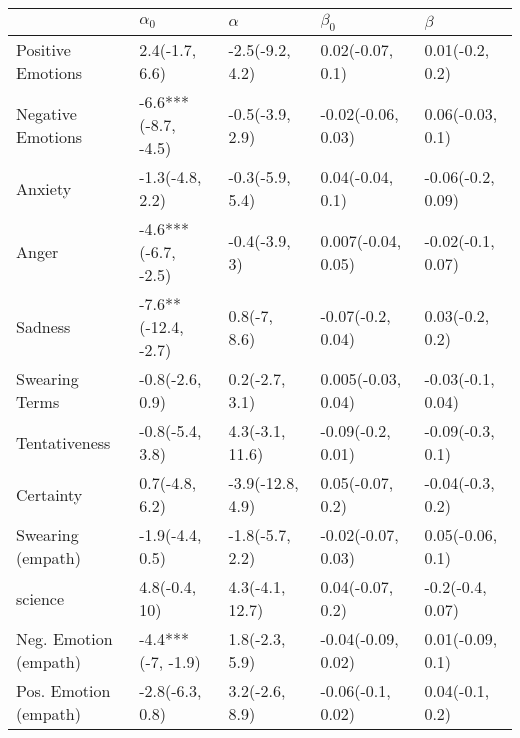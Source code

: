 \begin{tabular}{lllll}
\toprule
{} &           $\alpha_0$ &          $\alpha$ &           $\beta_0$ &            $\beta$ \\
\midrule
Positive Emotions     &       2.4(-1.7, 6.6) &   -2.5(-9.2, 4.2) &    0.02(-0.07, 0.1) &    0.01(-0.2, 0.2) \\
Negative Emotions     &  -6.6***(-8.7, -4.5) &   -0.5(-3.9, 2.9) &  -0.02(-0.06, 0.03) &   0.06(-0.03, 0.1) \\
Anxiety               &      -1.3(-4.8, 2.2) &   -0.3(-5.9, 5.4) &    0.04(-0.04, 0.1) &  -0.06(-0.2, 0.09) \\
Anger                 &  -4.6***(-6.7, -2.5) &     -0.4(-3.9, 3) &  0.007(-0.04, 0.05) &  -0.02(-0.1, 0.07) \\
Sadness               &  -7.6**(-12.4, -2.7) &      0.8(-7, 8.6) &   -0.07(-0.2, 0.04) &    0.03(-0.2, 0.2) \\
Swearing Terms        &      -0.8(-2.6, 0.9) &    0.2(-2.7, 3.1) &  0.005(-0.03, 0.04) &  -0.03(-0.1, 0.04) \\
Tentativeness         &      -0.8(-5.4, 3.8) &   4.3(-3.1, 11.6) &   -0.09(-0.2, 0.01) &   -0.09(-0.3, 0.1) \\
Certainty             &       0.7(-4.8, 6.2) &  -3.9(-12.8, 4.9) &    0.05(-0.07, 0.2) &   -0.04(-0.3, 0.2) \\
Swearing (empath)     &      -1.9(-4.4, 0.5) &   -1.8(-5.7, 2.2) &  -0.02(-0.07, 0.03) &   0.05(-0.06, 0.1) \\
science               &        4.8(-0.4, 10) &   4.3(-4.1, 12.7) &    0.04(-0.07, 0.2) &   -0.2(-0.4, 0.07) \\
Neg. Emotion (empath) &    -4.4***(-7, -1.9) &    1.8(-2.3, 5.9) &  -0.04(-0.09, 0.02) &   0.01(-0.09, 0.1) \\
Pos. Emotion (empath) &      -2.8(-6.3, 0.8) &    3.2(-2.6, 8.9) &   -0.06(-0.1, 0.02) &    0.04(-0.1, 0.2) \\
\bottomrule
\end{tabular}
